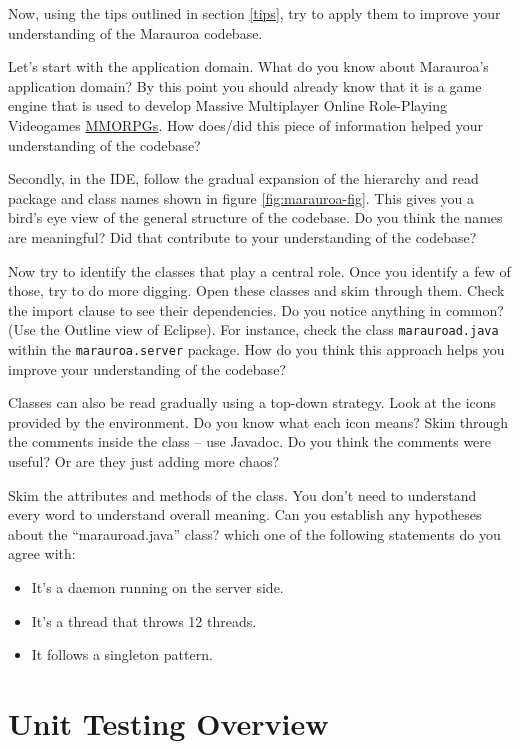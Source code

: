 \documentclass[
]{book}
\providecommand{\tightlist}{%
  \setlength{\itemsep}{0pt}\setlength{\parskip}{0pt}}
\begin{document}
Now, using the tips outlined in section \ref{tips}, try to apply them to improve your understanding of the Marauroa codebase.

Let's start with the application domain. What do you know about Marauroa's application domain? By this point you should already know that it is a game engine that is used to develop Massive Multiplayer Online Role-Playing Videogames \href{https://en.wikipedia.org/wiki/Massively_multiplayer_online_role-playing_game}{MMORPGs}. How does/did this piece of information helped your understanding of the codebase?

Secondly, in the IDE, follow the gradual expansion of the hierarchy and read package and class names shown in figure \ref{fig:marauroa-fig}. This gives you a bird's eye view of the general structure of the codebase. Do you think the names are meaningful? Did that contribute to your understanding of the codebase?

Now try to identify the classes that play a central role. Once you identify a few of those, try to do more digging. Open these classes and skim through them. Check the import clause to see their dependencies. Do you notice anything in common? (Use the Outline view of Eclipse). For instance, check the class \texttt{marauroad.java} within the \texttt{marauroa.server} package. How do you think this approach helps you improve your understanding of the codebase?

Classes can also be read gradually using a top-down strategy. Look at the icons provided by the environment. Do you know what each icon means? Skim through the comments inside the class -- use Javadoc. Do you think the comments were useful? Or are they just adding more chaos?

Skim the attributes and methods of the class. You don't need to understand every word to understand overall meaning. Can you establish any hypotheses about the ``marauroad.java'' class? which one of the following statements do you agree with:

\begin{itemize}
\tightlist
\item
  It's a daemon running on the server side.
\item
  It's a thread that throws 12 threads.
\item
  It follows a singleton pattern.
\end{itemize}

\hypertarget{unit-testing-overview}{%
\section{Unit Testing Overview}\label{unit-testing-overview}}
\end{document}
